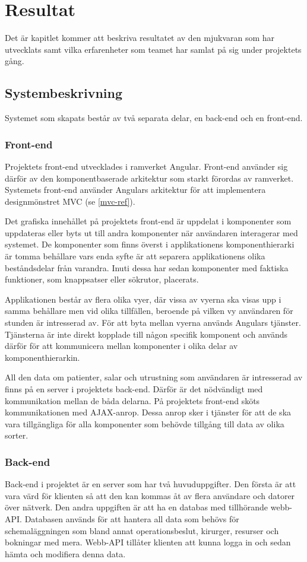 \chapter{Resultat}
Det är kapitlet kommer att beskriva resultatet av den mjukvaran som har utvecklats samt vilka erfarenheter som
teamet har samlat på sig under projektets gång.

\section{Systembeskrivning}
Systemet som skapats består av två separata delar, en back-end och en front-end.

\subsection{Front-end}
Projektets front-end utvecklades i ramverket Angular. Front-end använder sig därför av den komponentbaserade arkitektur som starkt förordas av ramverket. Systemets front-end använder Angulars arkitektur för att implementera designmönstret MVC (se \ref{mvc-ref}).

Det grafiska innehållet på projektets front-end är uppdelat i komponenter som uppdateras eller byts ut till andra komponenter när användaren interagerar med systemet. De komponenter som finns överst i applikationens komponenthierarki är tomma behållare vars enda syfte är att separera applikationens olika beståndsdelar från varandra. Inuti dessa har sedan komponenter med faktiska funktioner, som knappsatser eller sökrutor, placerats.

Applikationen består av flera olika vyer, där vissa av vyerna ska visas upp i samma behållare men vid olika tillfällen, beroende på vilken vy användaren för stunden är intresserad av. För att byta mellan vyerna används Angulars tjänster. Tjänsterna är inte direkt kopplade till någon specifik komponent och används därför för att kommunicera mellan komponenter i olika delar av komponenthierarkin.

All den data om patienter, salar och utrustning som användaren är intresserad av finns på en server i projektets back-end. Därför är det nödvändigt med kommunikation mellan de båda delarna. På projektets front-end sköts kommunikationen med AJAX-anrop. Dessa anrop sker i tjänster för att de ska vara tillgängliga för alla komponenter som behövde tillgång till data av olika sorter.

\subsection{Back-end}
Back-end i projektet är en server som har två huvuduppgifter. Den första är att vara värd för klienten så att den kan kommas åt av flera användare och datorer över nätverk. Den andra uppgiften är att ha en databas med tillhörande webb-API. Databasen används för att hantera all data som behövs för schemaläggningen som bland annat operationsbeslut, kirurger, resurser och bokningar med mera. Webb-API tillåter klienten att kunna logga in och sedan hämta och modifiera denna data.


